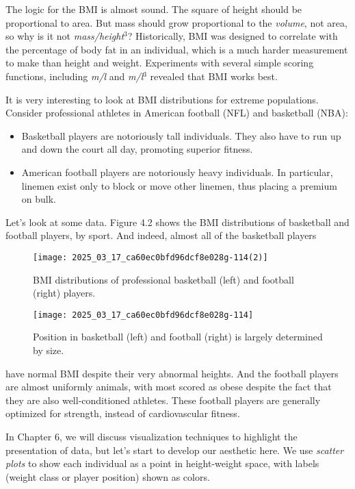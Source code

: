 \documentclass[10pt]{article}
\begin{document}
The logic for the BMI is almost sound. The square of height should be proportional to area. But mass should grow proportional to the \textit{volume}, not area, so why is it not \textit{mass/height}$^3$? Historically, BMI was designed to correlate with the percentage of body fat in an individual, which is a much harder measurement to make than height and weight. Experiments with several simple scoring functions, including \textit{m/l} and \textit{m/l}$^3$ revealed that BMI works best.

It is very interesting to look at BMI distributions for extreme populations. Consider professional athletes in American football (NFL) and basketball (NBA):
\begin{itemize}
  \item Basketball players are notoriously tall individuals. They also have to run up and down the court all day, promoting superior fitness.
  \item American football players are notoriously heavy individuals. In particular, linemen exist only to block or move other linemen, thus placing a premium on bulk.
\end{itemize}

Let's look at some data. Figure 4.2 shows the BMI distributions of basketball and football players, by sport. And indeed, almost all of the basketball players

\begin{figure}[h]
\centering
\texttt{[image: 2025\_03\_17\_ca60ec0bfd96dcf8e028g-114(2)]}
\caption{BMI distributions of professional basketball (left) and football (right) players.}
\end{figure}

\begin{figure}[h]
\centering
\texttt{[image: 2025\_03\_17\_ca60ec0bfd96dcf8e028g-114]}
\caption{Position in basketball (left) and football (right) is largely determined by size.}
\end{figure}

have normal BMI despite their very abnormal heights. And the football players are almost uniformly animals, with most scored as obese despite the fact that they are also well-conditioned athletes. These football players are generally optimized for strength, instead of cardiovascular fitness.

In Chapter 6, we will discuss visualization techniques to highlight the presentation of data, but let's start to develop our aesthetic here. We use \textit{scatter plots} to show each individual as a point in height-weight space, with labels (weight class or player position) shown as colors.
\end{document}
